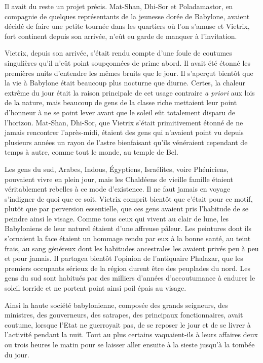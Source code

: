 \documentclass[a4paper, 11pt, oneside, polutonikogreek, french]{article}
\begin{document}
Il avait du reste un projet précis. Mat-Shan, Dhi-Sor et Poladamastor, en compagnie de quelques représentants de la jeunesse dorée de Babylone, avaient décidé de faire une petite tournée dans les quartiers où l'on s'amuse et Vietrix, fort continent depuis son arrivée, n'eût eu garde de manquer à l'invitation.

\bigskip
\centerline{\EightStarTaper}
\centerline{\EightStarTaper\EightStarTaper}
\bigskip

Vietrix, depuis son arrivée, s'était rendu compte d'une foule de coutumes singulières qu'il n'eût point soupçonnées de prime abord. Il avait été étonné les premières nuits d'entendre les mêmes bruits que le jour. Il s'aperçut bientôt que la vie à Babylone était beaucoup plus nocturne que diurne. Certes, la chaleur extrême du jour était la raison principale de cet usage contraire \emph{a priori} aux lois de la nature, mais beaucoup de gens de la classe riche mettaient leur point d'honneur à ne se point lever avant que le soleil eût totalement disparu de l'horizon. Mat-Shan, Dhi-Sor, que Vietrix s'était primitivement étonné de ne jamais rencontrer l'après-midi, étaient des gens qui n'avaient point vu depuis plusieurs années un rayon de l'astre bienfaisant qu'ils vénéraient cependant de temps à autre, comme tout le monde, au temple de Bel.

Les gens du sud, Arabes, Indous, Égyptiens, Israélites, voire Phéniciens, pouvaient vivre en plein jour, mais les Chaldéens de vieille famille étaient véritablement rebelles à ce mode d'existence. Il ne faut jamais en voyage s'indigner de quoi que ce soit. Vietrix comprit bientôt que c'était pour ce motif, plutôt que par perversion essentielle, que ces gens avaient pris l'habitude de se peindre ainsi le visage. Comme tous ceux qui vivent au clair de lune, les Babyloniens de leur naturel étaient d'une affreuse pâleur. Les peintures dont ils s'ornaient la face étaient un hommage rendu par eux à la bonne santé, au teint frais, au sang généreux dont les habitudes ancestrales les avaient privés peu à peu et pour jamais. Il partagea bientôt l'opinion de l'antiquaire Phalazar, que les premiers occupants sérieux de la région durent être des peuplades du nord. Les gens du sud sont habitués par des milliers d'années d'accoutumance à endurer le soleil torride et ne portent point ainsi poil épais au visage.

Ainsi la haute société babylonienne, composée des grands seigneurs, des ministres, des gouverneurs, des satrapes, des principaux fonctionnaires, avait coutume, lorsque l'Etat ne guerroyait pas, de se reposer le jour et de se livrer à l'activité pendant la nuit. Tout au plus certains vaquaient-ils à leurs affaires deux ou trois heures le matin pour se laisser aller ensuite à la sieste jusqu'à la tombée du jour.
\end{document}
